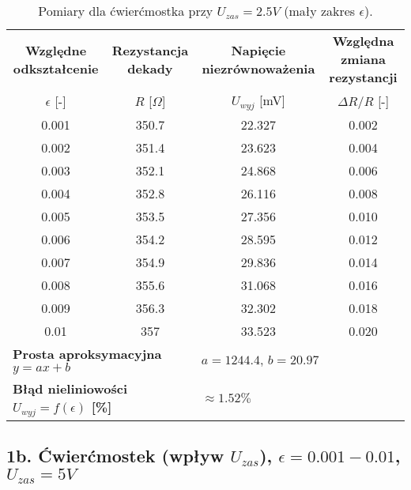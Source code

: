 \documentclass[12pt, a4paper]{article}
\begin{document}
	\begin{table}[H]
		\centering
		\caption{Pomiary dla ćwierćmostka przy $U_{zas} = 2.5 V$ (mały zakres $\epsilon$).}
		\begin{tabular}{cccc}
			\toprule
			\textbf{Względne odkształcenie} & \textbf{Rezystancja dekady} & \textbf{Napięcie niezrównoważenia} & \textbf{Względna zmiana rezystancji} \\
			$\epsilon$ [-] & $R$ [$\Omega$] & $U_{wyj}$ [mV] & $\Delta R/R$ [-] \\
			\midrule
			0.001 & 350.7 & 22.327 & 0.002 \\
			0.002 & 351.4 & 23.623 & 0.004 \\
			0.003 & 352.1 & 24.868 & 0.006 \\
			0.004 & 352.8 & 26.116 & 0.008 \\
			0.005 & 353.5 & 27.356 & 0.010 \\
			0.006 & 354.2 & 28.595 & 0.012 \\
			0.007 & 354.9 & 29.836 & 0.014 \\
			0.008 & 355.6 & 31.068 & 0.016 \\
			0.009 & 356.3 & 32.302 & 0.018 \\
			0.01 & 357 & 33.523 & 0.020 \\
			\midrule
			\multicolumn{2}{l}{\textbf{Prosta aproksymacyjna $y = ax + b$}} & \multicolumn{2}{l}{$a = 1244.4$, $b = 20.97$} \\
			\multicolumn{2}{l}{\textbf{Błąd nieliniowości $U_{wyj} = f(\epsilon)$ [\%]}} & \multicolumn{2}{l}{$\approx 1.52 \%$} \\
			\bottomrule
		\end{tabular}
	\end{table}
	
	\subsection{1b. Ćwierćmostek (wpływ $U_{zas}$), $\epsilon = 0.001-0.01$, $U_{zas} = 5 V$}
	
\end{document}
